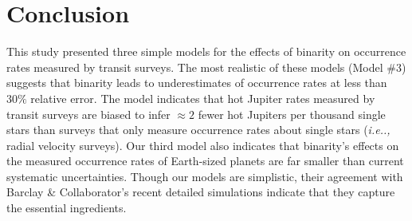 \section{Conclusion}
\label{sec:conclusion}

This study presented three simple models for the effects of binarity on 
occurrence rates measured by transit surveys.
The most realistic of these models (Model \#3) suggests that binarity leads to 
underestimates of occurrence rates at less than $30\%$ relative 
error.
The model indicates that hot Jupiter rates measured by transit surveys are 
biased to infer $\approx 2$ fewer hot Jupiters per thousand single stars than 
surveys that only measure occurrence rates about single stars ({\it i.e..,} 
radial velocity surveys).
Our third model also indicates that binarity's effects on the measured 
occurrence rates of Earth-sized planets are far smaller than current 
systematic uncertainties.
Though our models are simplistic, their agreement with Barclay \& 
Collaborator's recent detailed simulations indicate that they capture the 
essential ingredients.
